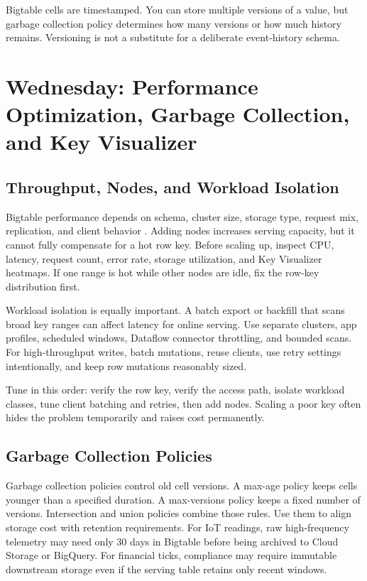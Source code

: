 \begin{notebox}
Bigtable cells are timestamped. You can store multiple versions of a value, but garbage collection policy determines how many versions or how much history remains. Versioning is not a substitute for a deliberate event-history schema.
\end{notebox}

\section{Wednesday: Performance Optimization, Garbage Collection, and Key Visualizer}

\subsection{Throughput, Nodes, and Workload Isolation}
Bigtable performance depends on schema, cluster size, storage type, request mix, replication, and client behavior \cite{googlecloudbigtableperformance}. Adding nodes increases serving capacity, but it cannot fully compensate for a hot row key. Before scaling up, inspect CPU, latency, request count, error rate, storage utilization, and Key Visualizer heatmaps. If one range is hot while other nodes are idle, fix the row-key distribution first.

Workload isolation is equally important. A batch export or backfill that scans broad key ranges can affect latency for online serving. Use separate clusters, app profiles, scheduled windows, Dataflow connector throttling, and bounded scans. For high-throughput writes, batch mutations, reuse clients, use retry settings intentionally, and keep row mutations reasonably sized.

\begin{tipbox}
Tune in this order: verify the row key, verify the access path, isolate workload classes, tune client batching and retries, then add nodes. Scaling a poor key often hides the problem temporarily and raises cost permanently.
\end{tipbox}

\subsection{Garbage Collection Policies}
Garbage collection policies control old cell versions. A max-age policy keeps cells younger than a specified duration. A max-versions policy keeps a fixed number of versions. Intersection and union policies combine those rules. Use them to align storage cost with retention requirements. For IoT readings, raw high-frequency telemetry may need only 30 days in Bigtable before being archived to Cloud Storage or BigQuery. For financial ticks, compliance may require immutable downstream storage even if the serving table retains only recent windows.

